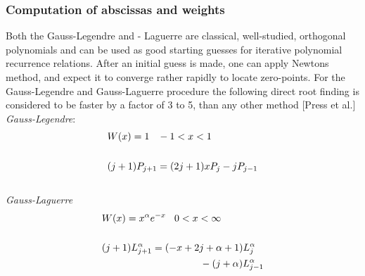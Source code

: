 \documentclass[%
reprint,
amsmath,amssymb,
aps,
]{revtex4-1}
\begin{document}
\subsubsection{Computation of abscissas and weights} \noindent
Both the Gauss-Legendre and - Laguerre are classical, well-studied, orthogonal polynomials and can be used as good starting guesses for iterative polynomial recurrence relations. After an initial guess is made, one can apply Newtons method, and expect  it to converge rather rapidly to locate zero-points. For the Gauss-Legendre and Gauss-Laguerre procedure the following direct root finding is considered to be faster by a factor of 3 to 5, than any other method [Press et al.] \vspace{5mm}\\
\vspace{2mm} \noindent 
\textit{Gauss-Legendre}: 
\begin{align}\label{glegfunc} 
	&W(x) = 1 \hspace{3mm} -1 < x < 1 \nonumber \\ & \nonumber \\ 
	&(j+1)P_{j+1} = (2j +1)xP_j - jP_{j-1}
\end{align} 
\vspace{2mm} \\ \noindent 
\textit{Gauss-Laguerre} \vspace{2mm}
\begin{align}\label{glagfunc}
&W(x) = x^\alpha e^{-x} \hspace{3mm} 0 < x < \infty \nonumber  \\ & \nonumber \\ 
&(j+1)L_{j+1}^\alpha = (-x+2j+\alpha+1)L_j^\alpha \nonumber \\ & \hspace{35mm}-(j+\alpha)L_{j-1}^\alpha
\end{align} 
\end{document}
